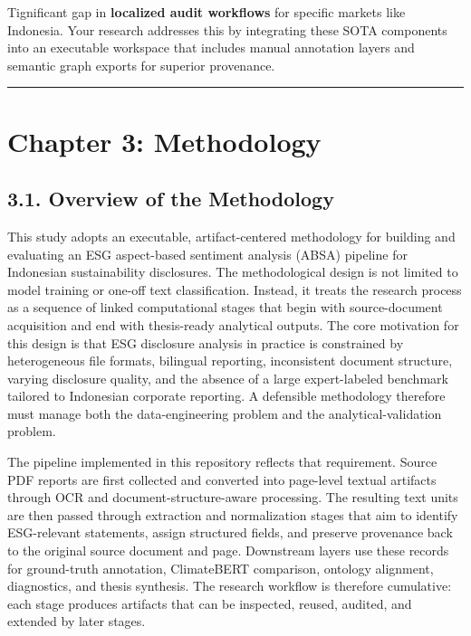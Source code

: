 \documentclass{article}
\begin{document}
Tignificant gap in \textbf{localized audit workflows} for specific markets like Indonesia. Your research addresses this by integrating these SOTA components into an executable workspace that includes manual annotation layers and semantic graph exports for superior provenance.
\begin{center}\rule{\linewidth}{0.5pt}\end{center}

\section*{Chapter 3: Methodology}
\subsection*{ 3.1. Overview of the Methodology}

This study adopts an executable, artifact-centered methodology for building and evaluating an ESG aspect-based sentiment analysis (ABSA) pipeline for Indonesian sustainability disclosures. The methodological design is not limited to model training or one-off text classification. Instead, it treats the research process as a sequence of linked computational stages that begin with source-document acquisition and end with thesis-ready analytical outputs. The core motivation for this design is that ESG disclosure analysis in practice is constrained by heterogeneous file formats, bilingual reporting, inconsistent document structure, varying disclosure quality, and the absence of a large expert-labeled benchmark tailored to Indonesian corporate reporting. A defensible methodology therefore must manage both the data-engineering problem and the analytical-validation problem.

The pipeline implemented in this repository reflects that requirement. Source PDF reports are first collected and converted into page-level textual artifacts through OCR and document-structure-aware processing. The resulting text units are then passed through extraction and normalization stages that aim to identify ESG-relevant statements, assign structured fields, and preserve provenance back to the original source document and page. Downstream layers use these records for ground-truth annotation, ClimateBERT comparison, ontology alignment, diagnostics, and thesis synthesis. The research workflow is therefore cumulative: each stage produces artifacts that can be inspected, reused, audited, and extended by later stages.
\end{document}
